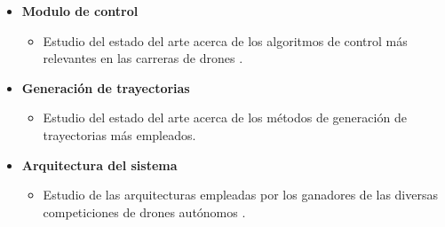 \begin{itemize}
	\item \textbf{Modulo de control}	
	\begin{itemize}
		\item Estudio del estado del arte acerca de los algoritmos de control más relevantes en las carreras de drones .
	\end{itemize}

	\item \textbf{Generación de trayectorias}	
	\begin{itemize}
		\item Estudio del estado del arte acerca de los métodos de generación de trayectorias más empleados.
	\end{itemize}

	\item \textbf{Arquitectura del sistema}	
	\begin{itemize}
		\item Estudio de las arquitecturas empleadas por los ganadores de las diversas competiciones de drones autónomos .
	\end{itemize}
	
	
\end{itemize}